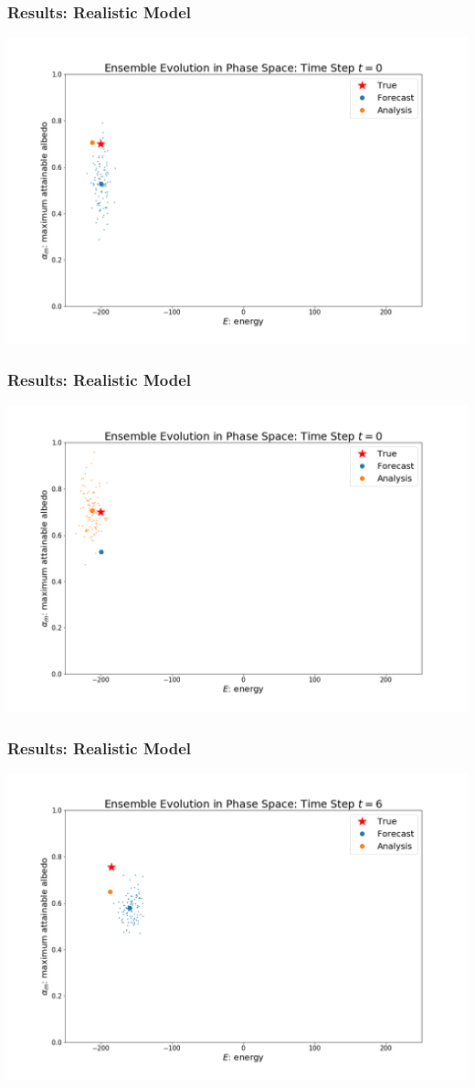 \documentclass{beamer}
\begin{document}
\begin{frame}
\frametitle{Results: Realistic Model}
\centering
\includegraphics[width=\linewidth]{Figures/EnsembleEvolution_forecast_t=0.png}
\end{frame}
\begin{frame}
\frametitle{Results: Realistic Model}
\centering
\includegraphics[width=\linewidth]{Figures/EnsembleEvolution_analysis_t=0.png}
\end{frame}
\begin{frame}
\frametitle{Results: Realistic Model}
\centering
\includegraphics[width=\linewidth]{Figures/EnsembleEvolution_forecast_t=6.png}
\end{frame}
\end{document}
